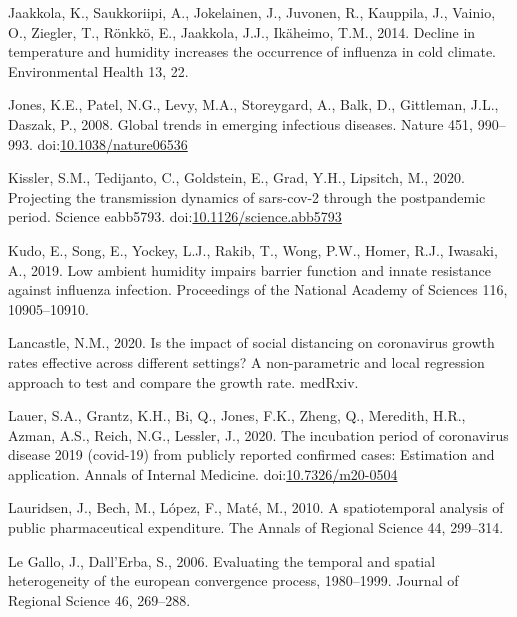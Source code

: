 \documentclass[]{elsarticle} %
\begin{document}
\leavevmode\hypertarget{ref-Jaakkola2014decline}{}%
Jaakkola, K., Saukkoriipi, A., Jokelainen, J., Juvonen, R., Kauppila,
J., Vainio, O., Ziegler, T., Rönkkö, E., Jaakkola, J.J., Ikäheimo, T.M.,
2014. Decline in temperature and humidity increases the occurrence of
influenza in cold climate. Environmental Health 13, 22.

\leavevmode\hypertarget{ref-Jones2008global}{}%
Jones, K.E., Patel, N.G., Levy, M.A., Storeygard, A., Balk, D.,
Gittleman, J.L., Daszak, P., 2008. Global trends in emerging infectious
diseases. Nature 451, 990--993.
doi:\href{https://doi.org/10.1038/nature06536}{10.1038/nature06536}

\leavevmode\hypertarget{ref-Kissler2020projecting}{}%
Kissler, S.M., Tedijanto, C., Goldstein, E., Grad, Y.H., Lipsitch, M.,
2020. Projecting the transmission dynamics of sars-cov-2 through the
postpandemic period. Science eabb5793.
doi:\href{https://doi.org/10.1126/science.abb5793}{10.1126/science.abb5793}

\leavevmode\hypertarget{ref-Kudo2019low}{}%
Kudo, E., Song, E., Yockey, L.J., Rakib, T., Wong, P.W., Homer, R.J.,
Iwasaki, A., 2019. Low ambient humidity impairs barrier function and
innate resistance against influenza infection. Proceedings of the
National Academy of Sciences 116, 10905--10910.

\leavevmode\hypertarget{ref-Lancastle2020impact}{}%
Lancastle, N.M., 2020. Is the impact of social distancing on coronavirus
growth rates effective across different settings? A non-parametric and
local regression approach to test and compare the growth rate. medRxiv.

\leavevmode\hypertarget{ref-Lauer2020incubation}{}%
Lauer, S.A., Grantz, K.H., Bi, Q., Jones, F.K., Zheng, Q., Meredith,
H.R., Azman, A.S., Reich, N.G., Lessler, J., 2020. The incubation period
of coronavirus disease 2019 (covid-19) from publicly reported confirmed
cases: Estimation and application. Annals of Internal Medicine.
doi:\href{https://doi.org/10.7326/m20-0504}{10.7326/m20-0504}

\leavevmode\hypertarget{ref-Lauridsen2010spatiotemporal}{}%
Lauridsen, J., Bech, M., López, F., Maté, M., 2010. A spatiotemporal
analysis of public pharmaceutical expenditure. The Annals of Regional
Science 44, 299--314.

\leavevmode\hypertarget{ref-Legallo2006evaluating}{}%
Le Gallo, J., Dall'Erba, S., 2006. Evaluating the temporal and spatial
heterogeneity of the european convergence process, 1980--1999. Journal
of Regional Science 46, 269--288.
\end{document}
